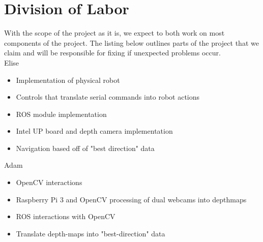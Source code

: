\documentclass[11pt]{amsart}
\begin{document}
\section{Division of Labor}
With the scope of the project as it is, we expect to both work on most components of the project.  The listing below outlines parts of the project that we claim and will be responsible for fixing if unexpected problems occur.\\

Elise
\begin{itemize}
\item Implementation of physical robot
\item Controls that translate serial commands into robot actions
\item ROS module implementation
\item Intel UP board and depth camera implementation
\item Navigation based off of "best direction" data
\end{itemize}

Adam
\begin{itemize}
\item OpenCV interactions
\item Raspberry Pi 3 and OpenCV processing of dual webcams into depthmaps
\item ROS interactions with OpenCV
\item Translate depth-maps into "best-direction" data
\end{itemize}
\end{document}
